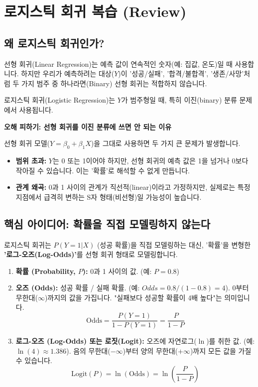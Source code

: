 \documentclass[11pt,a4paper]{book}
\theoremstyle{definition}
\begin{document}
\section{로지스틱 회귀 복습 (Review)}

\subsection{왜 로지스틱 회귀인가?}

선형 회귀(Linear Regression)는 예측 값이 연속적인 숫자(예: 집값, 온도)일 때 사용합니다.
하지만 우리가 예측하려는 대상($Y$)이 '성공/실패', '합격/불합격', '생존/사망'처럼 두 가지 범주 중 하나라면(Binary) 선형 회귀는 적합하지 않습니다.

로지스틱 회귀(Logistic Regression)는 $Y$가 범주형일 때,
특히 이진(binary) 분류 문제에서 사용됩니다.

\begin{warningbox}
  \textbf{오해 피하기: 선형 회귀를 이진 분류에 쓰면 안 되는 이유}

  선형 회귀 모델($Y = \beta_0 + \beta_1 X$)을 그대로 사용하면 두 가지 큰 문제가 발생합니다.
  \begin{itemize}
    \item \textbf{범위 초과:} $Y$는 0 또는 1이어야 하지만, 선형 회귀의 예측 값은 1을 넘거나 0보다 작아질 수 있습니다. 이는 '확률'로 해석할 수 없게 만듭니다.
    \item \textbf{관계 왜곡:} 0과 1 사이의 관계가 직선적(linear)이라고 가정하지만, 실제로는 특정 지점에서 급격히 변하는 S자 형태(비선형)일 가능성이 높습니다.
  \end{itemize}
\end{warningbox}

\subsection{핵심 아이디어: 확률을 직접 모델링하지 않는다}

로지스틱 회귀는 $P(Y=1|X)$ (성공 확률)을 직접 모델링하는 대신,
'확률'을 변형한 \textbf{'로그-오즈(Log-Odds)'}를 선형 회귀 형태로 모델링합니다.

\begin{enumerate}
  \item \textbf{확률 (Probability, $P$):} 0과 1 사이의 값. (예: $P = 0.8$)
  \item \textbf{오즈 (Odds):} 성공 확률 / 실패 확률. (예: $Odds = 0.8 / (1-0.8) = 4$). 0부터 무한대($\infty$)까지의 값을 가집니다. "실패보다 성공할 확률이 4배 높다"는 의미입니다.
      $$ \text{Odds} = \frac{P(Y=1)}{1 - P(Y=1)} = \frac{P}{1-P} $$
  \item \textbf{로그-오즈 (Log-Odds) 또는 로짓(Logit):} 오즈에 자연로그($\ln$)를 취한 값. (예: $\ln(4) \approx 1.386$). 음의 무한대($-\infty$)부터 양의 무한대($+\infty$)까지 모든 값을 가질 수 있습니다.
      $$ \text{Logit}(P) = \ln(\text{Odds}) = \ln\left(\frac{P}{1-P}\right) $$
\end{enumerate}
\end{document}
